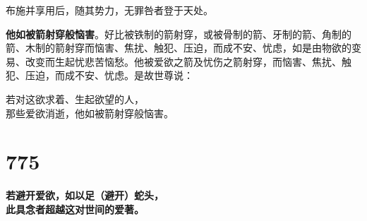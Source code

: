 布施并享用后，随其势力，无罪咎者登于天处。


\textbf{他如被箭射穿般恼害}。好比被铁制的箭射穿，或被骨制的箭、牙制的箭、角制的箭、木制的箭射穿而恼害、焦扰、触犯、压迫，而成不安、忧虑，如是由物欲的变易、改变而生起忧悲苦恼愁。他被爱欲之箭及忧伤之箭射穿，而恼害、焦扰、触犯、压迫，而成不安、忧虑。是故世尊说：


\begin{quoting}若对这欲求着、生起欲望的人，\\那些爱欲消逝，他如被箭射穿般恼害。\end{quoting}


\section*{775}

\begin{quoting}\textbf{若避开爱欲，如以足（避开）蛇头，\\此具念者超越这对世间的爱著。}\end{quoting}



